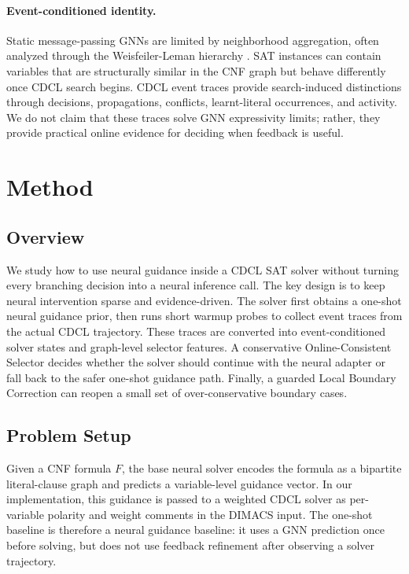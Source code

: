 \documentclass[11pt]{article}
\begin{document}
\paragraph{Event-conditioned identity.}
Static message-passing GNNs are limited by neighborhood aggregation, often analyzed through the Weisfeiler-Leman hierarchy \cite{gnnpowerful,morriswl}. SAT instances can contain variables that are structurally similar in the CNF graph but behave differently once CDCL search begins. CDCL event traces provide search-induced distinctions through decisions, propagations, conflicts, learnt-literal occurrences, and activity. We do not claim that these traces solve GNN expressivity limits; rather, they provide practical online evidence for deciding when feedback is useful.

\section{Method}

\subsection{Overview}

We study how to use neural guidance inside a CDCL SAT solver without turning every branching decision into a neural inference call. The key design is to keep neural intervention sparse and evidence-driven. The solver first obtains a one-shot neural guidance prior, then runs short warmup probes to collect event traces from the actual CDCL trajectory. These traces are converted into event-conditioned solver states and graph-level selector features. A conservative Online-Consistent Selector decides whether the solver should continue with the neural adapter or fall back to the safer one-shot guidance path. Finally, a guarded Local Boundary Correction can reopen a small set of over-conservative boundary cases.

\subsection{Problem Setup}

Given a CNF formula $F$, the base neural solver encodes the formula as a bipartite literal-clause graph and predicts a variable-level guidance vector. In our implementation, this guidance is passed to a weighted CDCL solver as per-variable polarity and weight comments in the DIMACS input. The one-shot baseline is therefore a neural guidance baseline: it uses a GNN prediction once before solving, but does not use feedback refinement after observing a solver trajectory.
\end{document}

